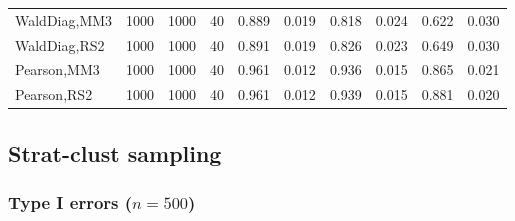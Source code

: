 \documentclass[
]{article}
\begin{document}
\begin{table}[H]
{\begin{tabular}[t]{lrrrrrrlrr}
\hspace{1em}WaldDiag,MM3 & 1000 & 1000 & 40 & 0.889 & 0.019 & 0.818 & 0.024 & 0.622 & 0.030\\
\hspace{1em}WaldDiag,RS2 & 1000 & 1000 & 40 & 0.891 & 0.019 & 0.826 & 0.023 & 0.649 & 0.030\\
\hspace{1em}Pearson,MM3 & 1000 & 1000 & 40 & 0.961 & 0.012 & 0.936 & 0.015 & 0.865 & 0.021\\
\hspace{1em}Pearson,RS2 & 1000 & 1000 & 40 & 0.961 & 0.012 & 0.939 & 0.015 & 0.881 & 0.020\\
\bottomrule
\end{tabular}}
\endgroup{}
\end{table}

\hypertarget{strat-clust-sampling}{%
\subsection{Strat-clust sampling}\label{strat-clust-sampling}}

\hypertarget{type-i-errors-n500-3}{%
\subsubsection{\texorpdfstring{Type I errors
(\(n=500\))}{Type I errors (n=500)}}\label{type-i-errors-n500-3}}
\end{document}
